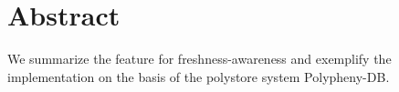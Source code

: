 \chapter{Abstract}
We summarize the feature for freshness-awareness and exemplify the implementation on the basis of the polystore system Polypheny-DB.